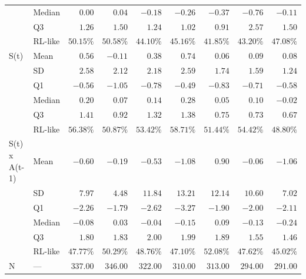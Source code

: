 \documentclass[
  number,
  preprint,
  3p,
  onecolumn]{elsarticle}
\begin{document}
\begin{longtable}{l|l|rrrrrrr}
 & Median & $0.00$ & $0.04$ & $-0.18$ & $-0.26$ & $-0.37$ & $-0.76$ & $-0.11$ \\ 
 & Q3 & $1.26$ & $1.50$ & $1.24$ & $1.02$ & $0.91$ & $2.57$ & $1.50$ \\ 
 & RL-like & $50.15\%$ & $50.58\%$ & $44.10\%$ & $45.16\%$ & $41.85\%$ & $43.20\%$ & $47.08\%$ \\ 
\midrule\addlinespace[2.5pt]
S(t) & Mean & $0.56$ & $-0.11$ & $0.38$ & $0.74$ & $0.06$ & $0.09$ & $0.08$ \\ 
 & SD & $2.58$ & $2.12$ & $2.18$ & $2.59$ & $1.74$ & $1.59$ & $1.24$ \\ 
 & Q1 & $-0.56$ & $-1.05$ & $-0.78$ & $-0.49$ & $-0.83$ & $-0.71$ & $-0.58$ \\ 
 & Median & $0.20$ & $0.07$ & $0.14$ & $0.28$ & $0.05$ & $0.10$ & $-0.02$ \\ 
 & Q3 & $1.41$ & $0.92$ & $1.32$ & $1.38$ & $0.75$ & $0.73$ & $0.67$ \\ 
 & RL-like & $56.38\%$ & $50.87\%$ & $53.42\%$ & $58.71\%$ & $51.44\%$ & $54.42\%$ & $48.80\%$ \\ 
\midrule\addlinespace[2.5pt]
S(t) x 
 A(t-1) & Mean & $-0.60$ & $-0.19$ & $-0.53$ & $-1.08$ & $0.90$ & $-0.06$ & $-1.06$ \\ 
 & SD & $7.97$ & $4.48$ & $11.84$ & $13.21$ & $12.14$ & $10.60$ & $7.02$ \\ 
 & Q1 & $-2.26$ & $-1.79$ & $-2.62$ & $-3.27$ & $-1.90$ & $-2.00$ & $-2.11$ \\ 
 & Median & $-0.08$ & $0.03$ & $-0.04$ & $-0.15$ & $0.09$ & $-0.13$ & $-0.24$ \\ 
 & Q3 & $1.80$ & $1.83$ & $2.00$ & $1.99$ & $1.89$ & $1.55$ & $1.46$ \\ 
 & RL-like & $47.77\%$ & $50.29\%$ & $48.76\%$ & $47.10\%$ & $52.08\%$ & $47.62\%$ & $45.02\%$ \\ 
\midrule\addlinespace[2.5pt]
N & — & $337.00$ & $346.00$ & $322.00$ & $310.00$ & $313.00$ & $294.00$ & $291.00$ \\ 
\bottomrule

\end{longtable}
\end{document}
